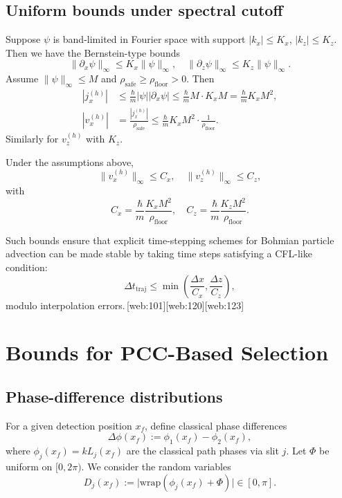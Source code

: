 \documentclass[11pt]{article}
\begin{document}
\begin{itemize}[leftmargin=*]
\subsection{Uniform bounds under spectral cutoff}

Suppose \(\psi\) is band-limited in Fourier space with support \(|k_x|\le K_x\), \(|k_z|\le K_z\).
Then we have the Bernstein-type bounds
\[
\|\partial_x\psi\|_\infty \le K_x \|\psi\|_\infty,\quad
\|\partial_z\psi\|_\infty \le K_z \|\psi\|_\infty.
\]
Assume \(\|\psi\|_\infty \le M\) and \(\rho_{\mathrm{safe}}\ge \rho_{\mathrm{floor}} >0\).
Then
\begin{align}
|j_x^{(h)}| &\le \frac{\hbar}{m}|\psi||\partial_x\psi|
\le \frac{\hbar}{m} M \cdot K_x M = \frac{\hbar}{m}K_x M^2,\\
|v_x^{(h)}| &= \frac{|j_x^{(h)}|}{\rho_{\mathrm{safe}}}
\le \frac{\hbar}{m}K_x M^2 \cdot \frac{1}{\rho_{\mathrm{floor}}}.
\end{align}
Similarly for \(v_z^{(h)}\) with \(K_z\).

\begin{proposition}
Under the assumptions above,
\[
\|v_x^{(h)}\|_\infty \le C_x,\quad \|v_z^{(h)}\|_\infty \le C_z,
\]
with
\[
C_x = \frac{\hbar}{m}\frac{K_x M^2}{\rho_{\mathrm{floor}}},\quad
C_z = \frac{\hbar}{m}\frac{K_z M^2}{\rho_{\mathrm{floor}}}.
\]
\end{proposition}

Such bounds ensure that explicit time-stepping schemes for Bohmian particle advection can be made stable by taking time steps satisfying a CFL-like condition:
\[
\Delta t_{\mathrm{traj}} \le \min\left(\frac{\Delta x}{C_x},\frac{\Delta z}{C_z}\right),
\]
modulo interpolation errors.\,[web:101][web:120][web:123]

\section{Bounds for PCC-Based Selection}

\subsection{Phase-difference distributions}

For a given detection position \(x_f\), define classical phase differences
\[
\Delta\phi(x_f) := \phi_1(x_f) - \phi_2(x_f),
\]
where \(\phi_j(x_f) = kL_j(x_f)\) are the classical path phases via slit \(j\).
Let \(\Phi\) be uniform on \([0,2\pi)\).
We consider the random variables
\[
D_j(x_f) := \big|\mathrm{wrap}(\phi_j(x_f) + \Phi)\big|\in[0,\pi].
\]


\end{itemize}
\end{document}
